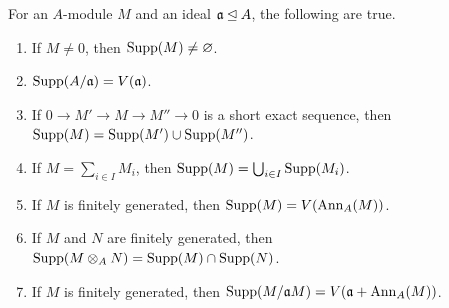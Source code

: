\begin{theorem}
    For an $A$-module $M$ and an ideal $\mathfrak a\unlhd A$, the following are true. 
    \begin{enumerate}[label=(\alph*)]
        \item If $M\ne 0$, then $\operatorname{Supp}(M)\ne\varnothing$. 
        \item $\operatorname{Supp}(A/\mathfrak a) = V(\mathfrak a)$.
        \item If $0\to M'\to M\to M''\to 0$ is a short exact sequence, then $\operatorname{Supp}(M) = \operatorname{Supp}(M')\cup\operatorname{Supp}(M'')$. 
        \item If $M = \sum_{i\in I} M_i$, then $\operatorname{Supp}(M) = \bigcup_{i\in I}\operatorname{Supp}(M_i)$. 
        \item If $M$ is finitely generated, then $\operatorname{Supp}(M) = V(\operatorname{Ann}_A(M))$. 
        \item If $M$ and $N$ are finitely generated, then $\operatorname{Supp}(M\otimes_A N) = \operatorname{Supp}(M)\cap\operatorname{Supp}(N)$. 
        \item If $M$ is finitely generated, then $\operatorname{Supp}(M/\mathfrak a M) = V(\mathfrak a + \operatorname{Ann}_A(M))$.
    \end{enumerate}
\end{theorem}
